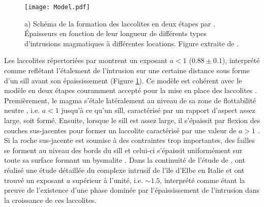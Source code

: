 \begin{figure}[htpb]
  \begin{center}
    \graphicspath{ {/Users/thorey/Documents/These/Manuscript/Figure/Chapter1/} }
    \texttt{[image: Model.pdf]}
    \caption{a) Schéma de  la formation des laccolites  en deux étapes
      par  \citet{McCaffrey:1997ea}.  Épaisseurs  en fonction  de leur
      longueur   de  différents   types  d'intrusions   magmatiques  à
      différentes locations.  Figure extraite de \citet{Cruden:tg}.}
    \label{Model}
  \end{center}
\end{figure}

Les laccolites répertoriées par  \citet{E:2015tl} montrent un exposant
$a<1$  ($0.88 \pm  0.1$),  interprété comme  reflétant l'étalement  de
l'intrusion sur une  certaine distance sous forme d'un  sill avant son
épaississement (Figure  \ref{Model}). Ce  modèle est cohérent  avec le
modèle en  deux étapes couramment  accepté pour  la mise en  place des
laccolites \citep{Johnson:1973ho,McCaffrey:1997ea}.   Premièrement, le
magma s'étale latéralement au niveau de sa zone de flottabilité neutre
,  i.e.  $a<1$  jusqu'à  ce  qu'un sill,  caractérisé  par un  rapport
d'aspect assez large, soit formé.   Ensuite, lorsque le sill est assez
large, il s'épaissit par flexion  des couches sus-jacentes pour former
un    laccolite    caractérisé    par     une    valeur    de    $a>1$
\citep{Johnson:1973ho,Koch:1981if}.   Si  la   roche  sus-jacente  est
soumise à des contraintes trop  importantes, des failles se forment au
niveau des bords du sill et celui-ci s'épaissit uniformément sur toute
sa surface formant un  bysmalite \citep{E:2015tl}.  Dans la continuité
de  l'étude  de  \citet{McCaffrey:1997ea},  \citet{Rocchi:2002jy}  ont
réalisé une  étude détaillée du  complexe intrusif de l'île  d'Elbe en
Italie  et  ont trouvé  un  exposant  $a$  supérieur à  l'unité,  i.e.
$\sim  1.5$, interprété  comme étant  la preuve  de l'existence  d'une
phase dominée  par l'épaississement de l'intrusion  dans la croissance
de ces laccolites.

